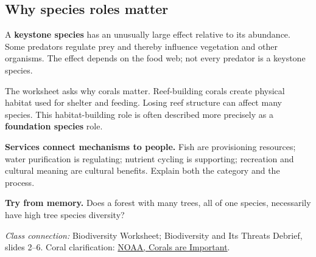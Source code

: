 \documentclass[11pt,letterpaper]{article}
\newcommand{\memorycheck}[1]{\par\smallskip\textbf{Try from memory.} #1\par}
\newcommand{\classsource}[1]{{\footnotesize\textit{Class connection:} #1\par}}
\begin{document}
\subsection*{Why species roles matter}
A \textbf{keystone species} has an unusually large effect relative to its abundance. Some predators regulate prey and thereby influence vegetation and other organisms. The effect depends on the food web; not every predator is a keystone species.

The worksheet asks why corals matter. Reef-building corals create physical habitat used for shelter and feeding. Losing reef structure can affect many species. This habitat-building role is often described more precisely as a \textbf{foundation species} role.
\begin{center}
\par
\end{center}
\textbf{Services connect mechanisms to people.} Fish are provisioning resources; water purification is regulating; nutrient cycling is supporting; recreation and cultural meaning are cultural benefits. Explain both the category and the process.
\memorycheck{Does a forest with many trees, all of one species, necessarily have high tree species diversity?}
\classsource{Biodiversity Worksheet; Biodiversity and Its Threats Debrief, slides 2--6. Coral clarification: \href{https://coralreef.noaa.gov/digital-corals/visual-media/infographics/corals-are-important}{NOAA, Corals are Important}.}
\end{document}
